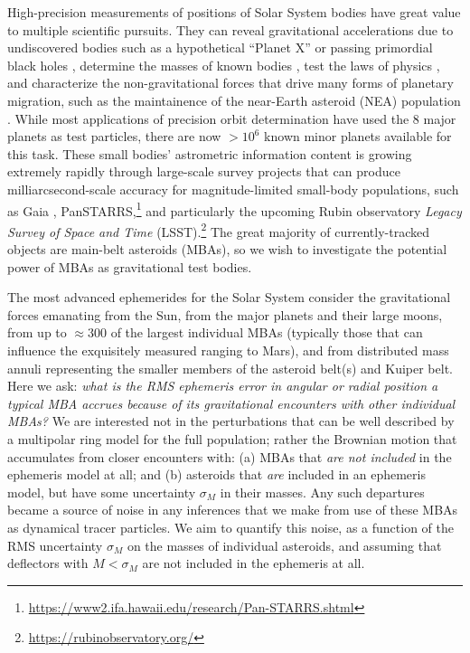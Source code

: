 \documentclass[linenumbers, onecolumn]{aastex631}
\newcommand{\eg}{\textit{e.g.\/}}
\begin{document}
High-precision measurements of positions of Solar System bodies have
great value to multiple scientific pursuits.  They can reveal
gravitational accelerations due to undiscovered bodies such as a
hypothetical ``Planet X'' \citep[\eg][]{holmanP9,inpopP9,trojans,occultations} or passing primordial
black holes \citep[\eg][]{pbh}, determine
the masses of known bodies \citep[\eg][]{goffin,baer}, test the laws
of physics \citep[\eg][]{inpopgraviton}, and characterize 
the non-gravitational forces that drive many forms of planetary
migration, such as the maintainence of the near-Earth asteroid (NEA)
population \citep[reviewed by][]{yarkovsky}.  While most applications of precision orbit determination
have used the 8 major planets as test particles, there are now $>10^6$
known minor planets available for this task.  These small bodies' astrometric
information content is growing extremely rapidly through large-scale
survey projects that can produce
milliarcsecond-scale accuracy for magnitude-limited small-body populations, such as Gaia \citep{gaiass3,gaiafpr},
PanSTARRS,\footnote{\url{https://www2.ifa.hawaii.edu/research/Pan-STARRS.shtml}}
and particularly the upcoming Rubin observatory
\textit{Legacy Survey of Space and Time} (LSST).\footnote{\url{https://rubinobservatory.org/}}  The great majority
of currently-tracked objects are main-belt asteroids (MBAs), so we
wish to investigate the potential power of MBAs as gravitational test
bodies.

The most advanced ephemerides for the Solar System \citep{de440,inpop,pitjeva} consider the
gravitational forces emanating from the Sun, from the major planets and their large
moons, from up to $\approx300$ of the largest individual MBAs (typically those that can influence the exquisitely measured ranging to Mars), and
from distributed mass annuli representing the smaller members of
 the asteroid belt(s) and Kuiper belt.
Here we ask: \textit{what is the RMS ephemeris error in angular or radial
position a typical MBA accrues because of its gravitational
encounters with other individual MBAs?}  We are interested not in the
perturbations that can be well described by a multipolar ring model
for the full population; rather the Brownian motion that accumulates
from closer encounters with: (a) MBAs that \emph{are not included} in the
ephemeris model at all; and (b) asteroids that \emph{are} included
in an ephemeris model, but have some uncertainty $\sigma_M$ in their masses.
Any such departures became a source of noise in any
inferences that we make from use of these MBAs as
dynamical tracer particles.  We aim to quantify this noise, as a
function of the RMS uncertainty $\sigma_M$ on the masses of individual
asteroids, and assuming that deflectors with $M<\sigma_M$ are not
included in the ephemeris at all.
\end{document}

